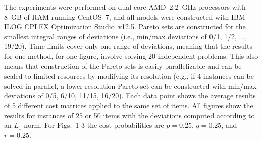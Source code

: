 \documentclass{llncs}
\begin{document}

The experiments were performed on dual core AMD~2.2~GHz processors with 8~GB of RAM running CentOS~7, and all models were constructed with IBM ILOG CPLEX Optimization Studio~v12.5. Pareto sets are constructed for the smallest integral ranges of deviations (i.e., min/max deviations of 0/1, 1/2, ..., 19/20). Time limits cover only one range of deviations, meaning that the results for one method, for one figure, involve solving 20 independent problems. This also means that construction of the Pareto sets is easily parallelizable and can be scaled to limited resources by modifying its resolution (e.g., if 4 instances can be solved in parallel, a lower-resolution Pareto set can be constructed with min/max deviations of 0/5, 6/10, 11/15, 16/20). Each data point shows the average results of 5 different cost matrices applied to the same set of items. All figures show the results for instances of 25 or 50 items with the deviations computed according to an $L_{1}$-norm. For Figs.~1-3 the cost probabilities are $p=0.25$, $q=0.25$, and $r=0.25$.
\end{document}
